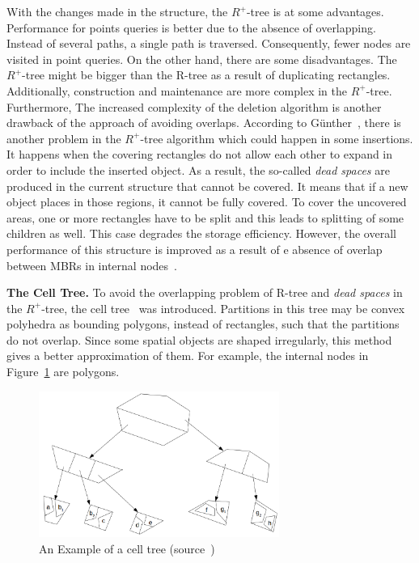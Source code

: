 \documentclass[a4paper,12pt]{article}
\begin{document}
With the changes made in the structure, the $R^+$-tree is at some advantages. Performance for points
queries is better due to the absence of overlapping. Instead of several paths, a single path is traversed. Consequently, fewer nodes are visited in point queries. On the other hand, there are some disadvantages. 
The {$R^+$-tree} might be bigger than the R-tree as a result of duplicating rectangles. Additionally, construction and maintenance are more complex in the {$R^+$-tree}. Furthermore, The increased complexity of the deletion algorithm is another drawback of the approach of avoiding overlaps.  
According to G{\"u}nther~\cite{efficientstruct}, there is another problem in the {$R^+$-tree} algorithm which could happen in some insertions. It happens when the covering rectangles do not allow each other to expand in order to include the inserted object. As a result, the so-called \textit{dead spaces} are produced in the current structure that cannot be covered. It means that if a new object places in those regions, it cannot be fully covered. To cover the uncovered areas, one or more rectangles have to be split and this leads to splitting of some children as well. This case degrades the storage efficiency. %
However, the overall performance of this structure is improved as a result of e absence of overlap between MBRs in internal nodes~\cite{Papadopoulos2010}.

\textbf{The Cell Tree.}
To avoid the overlapping problem of R-tree and \textit{dead spaces} in the $R^+$-tree, the cell tree~\cite{celltree} was introduced. Partitions in this tree may be convex polyhedra as bounding polygons, instead of rectangles, such that the partitions do not overlap. 
Since some spatial objects are shaped irregularly, this method gives a better approximation of them.
For example, the internal nodes in Figure~\ref{figcelltree} are polygons. 
\begin{figure}
\centering
\includegraphics[width=0.7\textwidth]{CellTree}
\caption{An Example of a cell tree (source~\cite{survey})}
\label{figcelltree}
\end{figure} 
\end{document}
